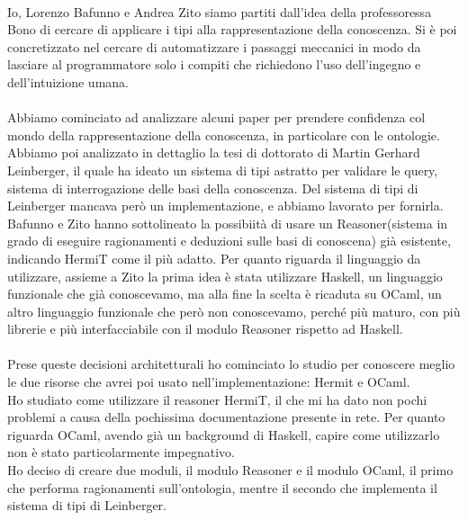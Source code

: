 \paragraph{} Io, Lorenzo Bafunno e Andrea Zito siamo partiti dall'idea della professoressa Bono di cercare di applicare i tipi alla rappresentazione della conoscenza. Si è poi concretizzato nel cercare di automatizzare i passaggi meccanici in modo da lasciare al programmatore solo i compiti che richiedono l'uso dell'ingegno e dell'intuizione umana.

\paragraph{} Abbiamo cominciato ad analizzare alcuni paper per prendere confidenza col mondo della rappresentazione della conoscenza, in particolare con le ontologie. Abbiamo poi analizzato in dettaglio la tesi di dottorato di Martin Gerhard Leinberger, il quale ha ideato un sistema di tipi astratto per validare le query, sistema di interrogazione delle basi della conoscenza. Del sistema di tipi di Leinberger mancava però un implementazione, e abbiamo lavorato per fornirla. Bafunno e Zito hanno sottolineato la possibiità di usare un Reasoner(sistema in grado di eseguire ragionamenti e deduzioni sulle basi di conoscena) già esistente, indicando HermiT come il più adatto. Per quanto riguarda il linguaggio da utilizzare, assieme a Zito la prima idea è stata utilizzare Haskell, un linguaggio funzionale che già conoscevamo, ma alla fine la scelta è ricaduta su OCaml, un altro linguaggio funzionale che però non conoscevamo, perché più maturo, con più librerie e più interfacciabile con il modulo Reasoner rispetto ad Haskell.

\paragraph{} Prese queste decisioni architetturali ho cominciato lo studio per conoscere meglio le due risorse che avrei poi usato nell'implementazione: Hermit e OCaml.\\
Ho studiato come utilizzare il reasoner HermiT, il che mi ha dato non pochi problemi  a causa della pochissima documentazione presente in rete. Per quanto riguarda OCaml, avendo già un background di Haskell, capire come utilizzarlo non è stato particolarmente impegnativo. \\
Ho deciso di creare due moduli, il modulo Reasoner e il modulo OCaml, il primo che performa ragionamenti sull'ontologia, mentre il secondo che implementa il sistema di tipi di Leinberger.

